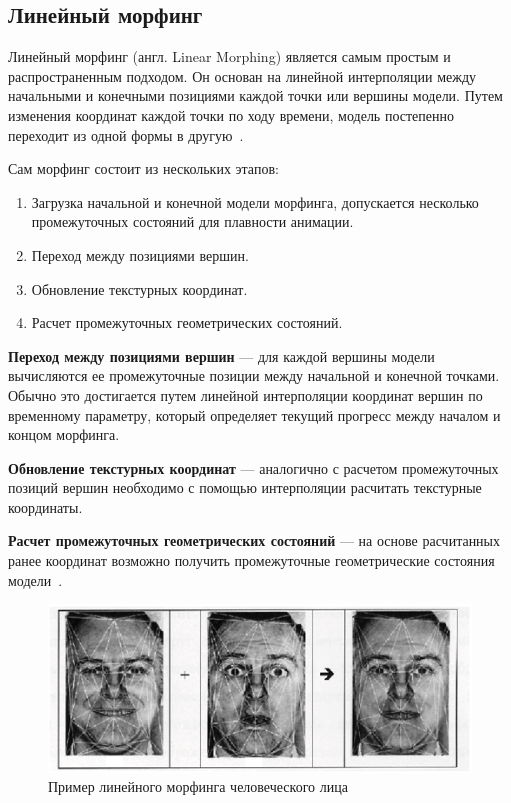 \subsection{Линейный морфинг}
Линейный морфинг (англ. Linear Morphing) является самым простым и распространенным подходом. 
Он основан на линейной интерполяции между начальными и конечными позициями каждой точки или вершины модели.
Путем изменения координат каждой точки по ходу времени, модель постепенно переходит из одной формы в другую~\cite{DMorph}.

Сам морфинг состоит из нескольких этапов: 
\begin{enumerate}
	\item Загрузка начальной и конечной модели морфинга, допускается несколько промежуточных состояний для плавности анимации.
	\item Переход между позициями вершин.
	\item Обновление текстурных координат.
	\item Расчет промежуточных геометрических состояний.
\end{enumerate}

\textbf{Переход между позициями вершин} --- для каждой вершины модели вычисляются ее промежуточные позиции между начальной и конечной точками.
Обычно это достигается путем линейной интерполяции координат вершин по временному параметру, который определяет текущий прогресс между началом и концом морфинга.

\textbf{Обновление текстурных координат} --- аналогично с расчетом промежуточных позиций вершин необходимо с помощью интерполяции расчитать текстурные координаты.

\textbf{Расчет промежуточных геометрических состояний} --- на основе расчитанных ранее координат возможно получить промежуточные геометрические состояния модели~\cite{DMorph}.

\begin{figure}[h]
	\centering
	\includegraphics{images/morhing_faces.png}
	\caption{Пример линейного морфинга человеческого лица}
	\label{fig:morhing_faces}
\end{figure}

